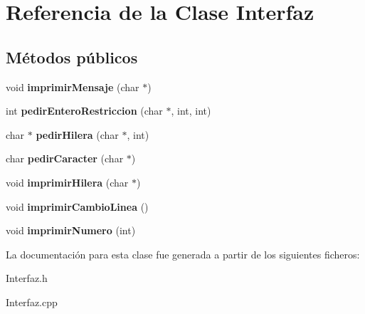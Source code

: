 \hypertarget{classInterfaz}{\section{Referencia de la Clase Interfaz}
\label{classInterfaz}
}
\subsection*{Métodos públicos}
\begin{DoxyCompactItemize}
\item 
\hypertarget{classInterfaz_a6382863414237dba0136f58e3c0b4da2}{void {\bfseries imprimir\-Mensaje} (char $\ast$)}\label{classInterfaz_a6382863414237dba0136f58e3c0b4da2}

\item 
\hypertarget{classInterfaz_ae4e5da263b8b0f7bc5e9e4cceccfcd05}{int {\bfseries pedir\-Entero\-Restriccion} (char $\ast$, int, int)}\label{classInterfaz_ae4e5da263b8b0f7bc5e9e4cceccfcd05}

\item 
\hypertarget{classInterfaz_a89c5a82f0ecf06e958e8081b8fbccb9e}{char $\ast$ {\bfseries pedir\-Hilera} (char $\ast$, int)}\label{classInterfaz_a89c5a82f0ecf06e958e8081b8fbccb9e}

\item 
\hypertarget{classInterfaz_a42855651b9ea0812909a9aa9297e3328}{char {\bfseries pedir\-Caracter} (char $\ast$)}\label{classInterfaz_a42855651b9ea0812909a9aa9297e3328}

\item 
\hypertarget{classInterfaz_aa8be240a3e161a0da875cab8f2d49617}{void {\bfseries imprimir\-Hilera} (char $\ast$)}\label{classInterfaz_aa8be240a3e161a0da875cab8f2d49617}

\item 
\hypertarget{classInterfaz_a26b3cb211a514f045afc8b7b6287adba}{void {\bfseries imprimir\-Cambio\-Linea} ()}\label{classInterfaz_a26b3cb211a514f045afc8b7b6287adba}

\item 
\hypertarget{classInterfaz_a10c786792b9e1ae657bd08e6247a4144}{void {\bfseries imprimir\-Numero} (int)}\label{classInterfaz_a10c786792b9e1ae657bd08e6247a4144}

\end{DoxyCompactItemize}


La documentación para esta clase fue generada a partir de los siguientes ficheros\-:\begin{DoxyCompactItemize}
\item 
Interfaz.\-h\item 
Interfaz.\-cpp\end{DoxyCompactItemize}
